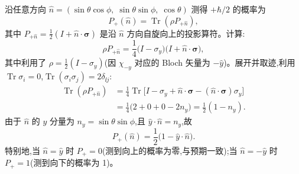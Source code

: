 \begin{solution}
沿任意方向 $\hat n = (\sin\theta\cos\phi,\;\sin\theta\sin\phi,\;\cos\theta)$ 测得 $+\hbar/2$ 的概率为
\[
P_+(\hat n) = \operatorname{Tr}(\rho P_{+\hat n}),
\]
其中 $P_{+\hat n} = \frac{1}{2}(I+\hat n\cdot\boldsymbol\sigma)$ 是沿 $\hat n$ 方向自旋向上的投影算符。计算:
\[
\rho P_{+\hat n} = \frac{1}{4}\bigl(I-\sigma_y\bigr)\bigl(I+\hat n\cdot\boldsymbol\sigma\bigr),
\]
其中利用了 $\rho = \frac{1}{2}(I-\sigma_y)$(因 $\chi_{-y}$ 对应的 Bloch 矢量为 $-\hat y$)。展开并取迹,利用 $\operatorname{Tr}\sigma_i=0$,$\operatorname{Tr}(\sigma_i\sigma_j)=2\delta_{\ii j}$:
\[
\begin{aligned}
\operatorname{Tr}(\rho P_{+\hat n})
&= \frac{1}{4}\operatorname{Tr}\bigl[I - \sigma_y + \hat n\cdot\boldsymbol\sigma - (\hat n\cdot\boldsymbol\sigma)\sigma_y\bigr]\\[2mm]
&= \frac{1}{4}\bigl(2 + 0 + 0 - 2 n_y\bigr)
= \frac{1}{2}(1 - n_y).
\end{aligned}
\]
由于 $\hat n$ 的 $y$ 分量为 $n_y = \sin\theta\sin\phi$,且 $\hat y\cdot\hat n = n_y$,故
\[
\boxed{P_+(\hat n) = \frac{1}{2}\bigl(1 - \hat y\cdot\hat n\bigr).}
\]
特别地,当 $\hat n = \hat y$ 时 $P_+ = 0$(测到向上的概率为零,与预期一致);当 $\hat n = -\hat y$ 时 $P_+ = 1$(测到向下的概率为 1)。
\end{solution}

